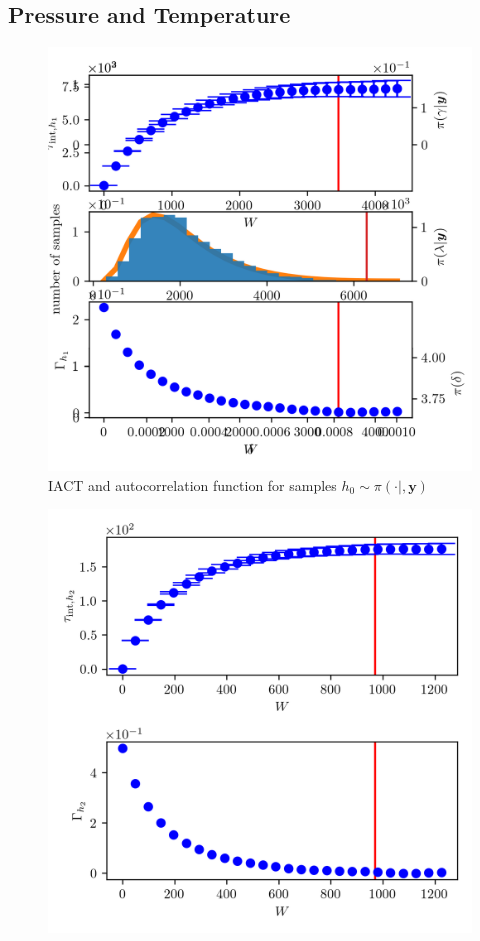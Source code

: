 \subsection{Pressure and Temperature}
\begin{figure}[ht!]
	\centering
	\includegraphics{UwerrTauIntTWalk0.png}
	\caption[IACT and autocorrelation function for samples $h_0 \sim \pi( \cdot | , \bm{y})$]{IACT and autocorrelation function for samples $h_0 \sim \pi( \cdot | , \bm{y})$}
	\label{fig:}
\end{figure}
\begin{figure}[ht!]
	\centering
	\includegraphics{UwerrTauIntTWalk1.png}
	\caption[]{}
	\label{fig:}
\end{figure}


